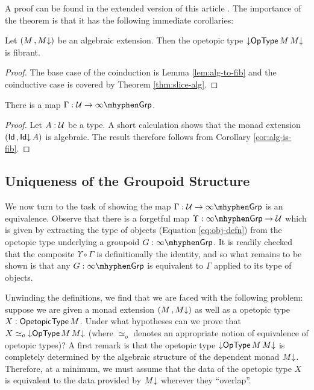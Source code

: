 A proof can be found in the extended version of this article
\cite{allioux2021types}.  The importance of the theorem is that it has
the following immediate corollaries:

\begin{cor}
  \label{cor:alg-is-fib}
  Let $(M \,, M{\downarrow})$ be an algebraic extension.  Then the opetopic
  type ${\downarrow}\mathsf{OpType}\, M\, M{\downarrow}$ is fibrant.
\end{cor}

\begin{proof}
  The base case of the coinduction is Lemma \ref{lem:alg-to-fib} and
  the coinductive case is covered by Theorem
  \ref{thm:slice-alg}.
\end{proof}

\begin{cor}
  There is a map $\Gamma : \UU \to \ooGrp$.
\end{cor}

\begin{proof}
  Let $A : \mathcal{U}$ be a type.  A short calculation shows that
  the monad extension $(\mathsf{Id} \,, \mathsf{Id}{\downarrow}\, A)$ is algebraic.
  The result therefore follows from Corollary \ref{cor:alg-is-fib}.
\end{proof}

\subsection{Uniqueness of the Groupoid Structure}

We now turn to the task of showing the map $\Gamma : \UU \to \ooGrp$
is an equivalence.  Observe that there is a forgetful map
$\Upsilon : \ooGrp \to \UU$ which is given by extracting the type of
objects (Equation \ref{eq:obj-defn}) from the opetopic type underlying
a groupoid $G : \ooGrp$.  It is readily checked that the composite
$\Upsilon \circ \Gamma$ is definitionally the identity, and so what
remains to be shown is that any $G : \ooGrp$ is equivalent to $\Gamma$
applied to its type of objects.

Unwinding the definitions, we find that we are faced with the following
problem: suppose we are given a monad extension $(M \,, M{\downarrow})$ as well
as a opetopic type $X : \mathsf{OpetopicType}\, M$.  Under what hypotheses can we
prove that $X \simeq_{o} {\downarrow}\mathsf{OpType}\, M\, M{\downarrow}$ (where $\simeq_o$
denotes an appropriate notion of equivalence of opetopic types)?  A
first remark is that the opetopic type ${\downarrow}\mathsf{OpType}\, M\, M{\downarrow}$ is
completely determined by the algebraic structure of the dependent
monad $M{\downarrow}$.  Therefore, at a minimum, we must assume that the data
of the opetopic type $X$ is equivalent to the data provided by $M{\downarrow}$
wherever they ``overlap''.

